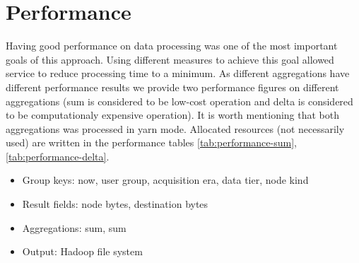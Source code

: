 \documentclass[a4paper]{jpconf}
\begin{document}
\section{Performance}

Having good performance on data processing was one of the most important goals of this approach. Using different measures to achieve this goal allowed service to reduce processing time to a 
minimum. As different aggregations have different performance results we provide two performance figures on different aggregations (sum is considered to be low-cost operation and delta is 
considered to be computationaly expensive operation). It is worth mentioning that both aggregations was processed in yarn mode. Allocated resources (not necessarily used) are written in the 
performance tables \ref{tab:performance-sum}, \ref{tab:performance-delta}.

\begin{itemize}
\item Group keys: now, user group, acquisition era, data tier, node kind
\item Result fields: node bytes, destination bytes
\item Aggregations: sum, sum
\item Output: Hadoop file system
\end{itemize}
\end{document}
